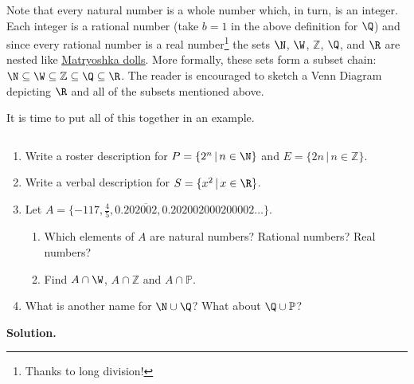 \documentclass{ximera}
\begin{document}
\medskip

Note that every natural number is a whole number which, in turn, is an integer.   Each integer is a rational number (take $b =1$ in the above definition for $\Q$) and since every rational number is a real number\footnote{Thanks to long division!}  the sets $\N$, $\W$, $\mathbb Z$, $\Q$, and  $\R$ are nested like \href{http://en.wikipedia.org/wiki/Matryoshka_doll}{\underline{Matryoshka dolls}}. More formally, these sets form a subset chain:  $\N \subseteq \W \subseteq \mathbb Z \subseteq \Q \subseteq \R$.  The reader is encouraged to sketch a Venn Diagram depicting $\R$ and all of the subsets mentioned above.  

\smallskip

It is time to put all of this together in an example.

\begin{example} \label{numbersetex}   $~$

\begin{enumerate}

\item  Write a roster description for $P = \{ 2^{n} \, | \, n \in \N \}$  and $E = \{ 2n \, | \, n \in \mathbb Z \}$.

\item Write a verbal description for $S = \{ x^2 \, | \, x \in \R \}$.

\item Let $A = \{-117, \frac{4}{5}, 0.20\overline{2002}, 0.202002000200002 \ldots\}$. 

\begin{enumerate}

\item Which elements of $A$ are natural numbers?  Rational numbers?  Real numbers?

\item Find $A \cap \W$, $A \cap \mathbb Z$ and $A \cap \mathbb P$.

\end{enumerate}

\item  What is another name for $\N \cup \Q$?  What about  $\Q \cup \mathbb P$?

\end{enumerate}

{\bf Solution.}

\begin{enumerate}


\end{enumerate}
\end{example}
\end{document}
